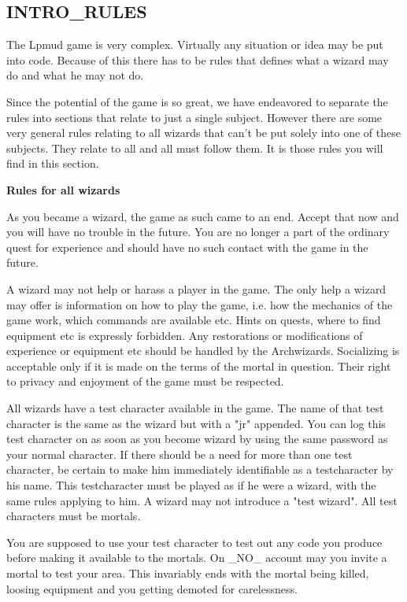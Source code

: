 \subsection{INTRO\_RULES}

The Lpmud game is very complex. Virtually any situation or idea may be
put into code. Because of this there has to be rules that defines what
a wizard may do and what he may not do.

Since the potential of the game is so great, we have endeavored to
separate the rules into sections that relate to just a single subject.
However there are some very general rules relating to all wizards that
can't be put solely into one of these subjects. They relate to all and
all must follow them. It is those rules you will find in this section.

{\bf Rules for all wizards}

As you became a wizard, the game as such came to an end. Accept that
now and you will have no trouble in the future. You are no longer a
part of the ordinary quest for experience and should have no such 
contact with the game in the future.

A wizard may not help or harass a player in the game. The only help a
wizard may offer is information on how to play the game, i.e. how the
mechanics of the game work, which commands are available etc. Hints
on quests, where to find equipment etc is expressly forbidden. Any
restorations or modifications of experience or equipment etc should be
handled by the Archwizards. Socializing is acceptable only if it is
made on the terms of the mortal in question. Their right to privacy
and enjoyment of the game must be respected.

All wizards have a test character available in the game. The name of
that test character is the same as the wizard but with a "jr" appended.
You can log this test character on as soon as you become wizard by
using the same password as your normal character. If there should be a
need for more than one test character, be certain to make him
immediately identifiable as a testcharacter by his name. This
testcharacter must be played as if he were a wizard, with the same
rules applying to him. A wizard may not introduce a "test wizard".
All test characters must be mortals. 

You are supposed to use your test character to test out any code you
produce before making it available to the mortals. On \_NO\_ account may
you invite a mortal to test your area. This invariably ends with the
mortal being killed, loosing equipment and you getting demoted for
carelessness.


